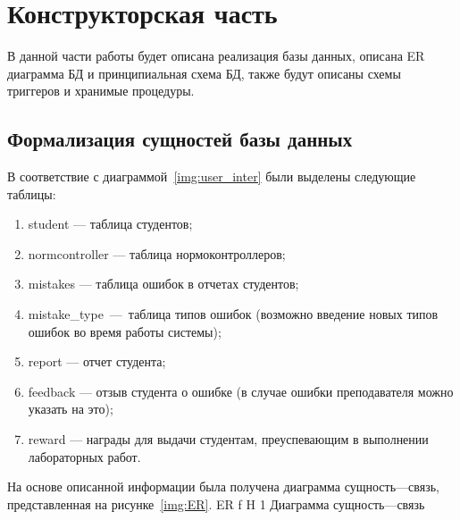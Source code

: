
\chapter{Конструкторская часть}
В данной части работы будет описана реализация базы данных, описана ER диаграмма БД и принципиальная схема БД, также будут описаны схемы триггеров и хранимые процедуры.

\section{Формализация сущностей базы данных}

В соответствие с диаграммой~\ref{img:user_inter} были выделены следующие таблицы:
\begin{enumerate}
	\item student --- таблица студентов;
	\item normcontroller --- таблица нормоконтроллеров;
	\item mistakes --- таблица ошибок в отчетах студентов;
	\item mistake\_type~---~таблица типов ошибок (возможно введение новых типов ошибок во время работы системы);
	\item report --- отчет студента;
	\item feedback --- отзыв студента о ошибке (в случае ошибки преподавателя можно указать на это);
	\item reward --- награды для выдачи студентам, преуспевающим в выполнении лабораторных работ.
\end{enumerate}
На основе описанной информации была получена диаграмма сущность---связь, представленная на рисунке~\ref{img:ER}.
{ER} %
{f} %
{H} %
{1\textwidth} %
{Диаграмма сущность---связь} %


